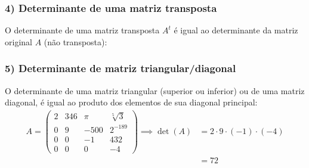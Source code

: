 \documentclass[pdftex, brazil, aspectratio=169]{beamer}
\begin{document}
\begin{frame}[t]

\end{frame}

\begin{frame}[t]
  \frametitle{4) Determinante de uma matriz transposta}
  O determinante de uma matriz transposta $A^t$ é igual ao determinante da
  matriz original $A$ (não transposta):

\end{frame}

\begin{frame}[t]
  \frametitle{5) Determinante de matriz triangular/diagonal}
  O determinante de uma matriz triangular (superior ou inferior) ou de uma
  matriz diagonal, é igual ao produto dos elementos de sua diagonal principal:
  \begin{equation*}\begin{split}A = \begin{pmatrix}
    2 & 346 & \pi & \sqrt[5]{3}\\
    0 & 9 & -500 & 2^{-189}\\
    0 & 0 & -1 & 432\\
    0 & 0 & 0 & -4\end{pmatrix} \implies \det(A) &= 2 \cdot 9 \cdot (-1) \cdot (-4)\\
                                               &=72\end{split}\end{equation*}
\end{frame}
\end{document}
